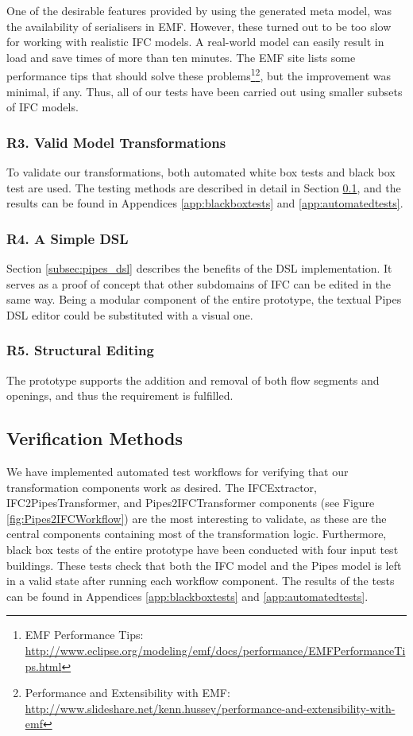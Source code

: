 One of the desirable features provided by using the generated meta model, was the availability of serialisers in EMF. However, these turned out to be too slow for working with realistic IFC models. A real-world model can easily result in load and save times of more than ten minutes. The EMF site lists some performance tips that should solve these problems\footnote{EMF Performance Tips: \url{http://www.eclipse.org/modeling/emf/docs/performance/EMFPerformanceTips.html}}\footnote{Performance and Extensibility with EMF: \url{http://www.slideshare.net/kenn.hussey/performance-and-extensibility-with-emf}}, but the improvement was minimal, if any. Thus, all of our tests have been carried out using smaller subsets of IFC models. 

\subsubsection{R3. Valid Model Transformations} 
To validate our transformations, both automated white box tests and black box test are used. The testing methods are described in detail in Section \ref{subsec:verification_methods}, and the results can be found in Appendices \ref{app:blackboxtests} and \ref{app:automatedtests}.

\subsubsection{R4. A Simple DSL} Section \ref{subsec:pipes_dsl} describes the benefits of the DSL implementation. It serves as a proof of concept that other subdomains of IFC can be edited in the same way. Being a modular component of the entire prototype, the textual Pipes DSL editor could be substituted with a visual one.

\subsubsection{R5. Structural Editing}
The prototype supports the addition and removal of both flow segments and openings, and thus the requirement is fulfilled.

\subsection{Verification Methods}
\label{subsec:verification_methods}
We have implemented automated test workflows for verifying that our transformation components work as desired. The IFCExtractor, IFC2PipesTransformer, and Pipes2IFCTransformer components (see Figure \ref{fig:Pipes2IFCWorkflow}) are the most interesting to validate, as these are the central components containing most of the transformation logic. Furthermore, black box tests of the entire prototype have been conducted with four input test buildings. These tests check that both the IFC model and the Pipes model is left in a valid state after running each workflow component. The results of the tests can be found in Appendices \ref{app:blackboxtests} and \ref{app:automatedtests}.

